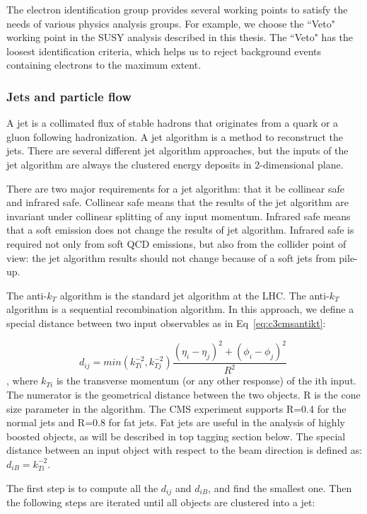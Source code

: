 The electron identification group provides several working points to satisfy the needs of various physics analysis groups. For example, we choose the ``Veto" working point in the SUSY analysis described in this thesis. The ``Veto" has the loosest identification criteria, which helps us to reject background events containing electrons to the maximum extent. 
\subsubsection{Jets and particle flow}

A jet is a collimated flux of stable hadrons that originates from a quark or a gluon following hadronization. A jet algorithm is a method to reconstruct the jets. There are several different jet algorithm approaches, but the inputs of the jet algorithm are always the clustered energy deposits in 2-dimensional plane. 

There are two major requirements for a jet algorithm: that it be collinear safe and infrared safe. Collinear safe means that the results of the jet algorithm are invariant under collinear splitting of any input momentum. Infrared safe means that a soft emission does not change the results of jet algorithm. Infrared safe is required not only from soft QCD emissions, but also from the collider point of view: the jet algorithm results should not change because of a soft jets from pile-up. 

The anti-$k_{T}$ algorithm\cite{Cacciari:2008gp} is the standard jet algorithm at the LHC. The anti-$k_{T}$ algorithm is a sequential recombination algorithm. In this approach, we define a special distance between two input observables as in  Eq~\ref{eq:c3cmsantikt}:

\begin{equation}
 d_{ij} = min(k_{Ti}^{-2},k_{Tj}^{-2})\frac{(\eta_{i}-\eta_{j})^{2}+(\phi_{i}-\phi_{j})^{2}}{R^{2}} \;
 \label{eq:c3cmsantikt}
\end{equation}
, where $k_{Ti}$ is the transverse momentum (or any other response) of the ith input. The numerator is the geometrical distance between the two objects. R is the cone size parameter in the algorithm. The CMS experiment supports R=0.4 for the normal jets and R=0.8 for fat jets. Fat jets are useful in the analysis of highly boosted objects, as will be described in top tagging section below. The special distance between an input object with respect to the beam direction is defined as: $d_{iB} = k_{Ti}^{-2}$.

The first step is to compute all the $d_{ij}$ and $d_{iB}$, and find the smallest one. Then the following steps are iterated until all objects are clustered into a jet: 

